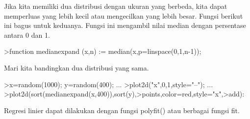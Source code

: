 \documentclass[a4paper,10pt]{article}
\begin{document}
\begin{eulernotebook}
\begin{eulercomment}
\begin{eulercomment}
\begin{eulercomment}
\begin{eulercomment}
\begin{eulercomment}
\begin{eulercomment}
\begin{eulercomment}
\begin{eulercomment}
\begin{eulercomment}
\begin{eulercomment}
\begin{eulercomment}
\begin{eulercomment}
\begin{eulercomment}
\begin{eulercomment}
\begin{eulercomment}
\begin{eulercomment}
\begin{eulercomment}
\begin{eulercomment}
\begin{eulercomment}
\begin{eulercomment}
\begin{eulercomment}
\begin{eulercomment}
\begin{eulercomment}
\begin{eulercomment}
\begin{eulercomment}
\begin{eulercomment}
\begin{eulercomment}
\begin{eulercomment}
\begin{eulercomment}
\begin{eulercomment}
\begin{eulercomment}
\begin{eulercomment}
\begin{eulercomment}
Jika kita memiliki dua distribusi dengan ukuran yang berbeda, kita
dapat memperluas yang lebih kecil atau mengecilkan yang lebih besar.
Fungsi berikut ini bagus untuk keduanya. Fungsi ini mengambil nilai
median dengan persentase antara 0 dan 1.
\end{eulercomment}
\begin{eulerprompt}
>function medianexpand (x,n) := median(x,p=linspace(0,1,n-1));
\end{eulerprompt}
\begin{eulercomment}
Mari kita bandingkan dua distribusi yang sama.
\end{eulercomment}
\begin{eulerprompt}
>x=random(1000); y=random(400); ...
>plot2d("x",0,1,style="--"); ...
>plot2d(sort(medianexpand(x,400)),sort(y),>points,color=red,style="x",>add):
\end{eulerprompt}
\begin{eulercomment}
Regresi linier dapat dilakukan dengan fungsi polyfit() atau berbagai
fungsi fit.


\end{eulercomment}
\end{eulercomment}
\end{eulercomment}
\end{eulercomment}
\end{eulercomment}
\end{eulercomment}
\end{eulercomment}
\end{eulercomment}
\end{eulercomment}
\end{eulercomment}
\end{eulercomment}
\end{eulercomment}
\end{eulercomment}
\end{eulercomment}
\end{eulercomment}
\end{eulercomment}
\end{eulercomment}
\end{eulercomment}
\end{eulercomment}
\end{eulercomment}
\end{eulercomment}
\end{eulercomment}
\end{eulercomment}
\end{eulercomment}
\end{eulercomment}
\end{eulercomment}
\end{eulercomment}
\end{eulercomment}
\end{eulercomment}
\end{eulercomment}
\end{eulercomment}
\end{eulercomment}
\end{eulercomment}
\end{eulernotebook}
\end{document}
